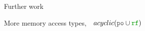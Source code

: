 \begin{frame}{Further work}
  \vspace{0.5cm}
  \renewcommand{\ULthickness}{0.75pt}
  \begin{center}
    {\large More memory access types,\ \   \sout{$acyclic(\lPO \cup \lRF)$}}
\end{center}

\end{frame}

